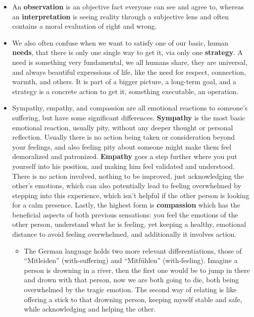 \begin{itemize}
\begin{itemize}
    \end{itemize}
    \item An \textbf{observation} is an objective fact everyone can see and agree to, whereas an \textbf{interpretation} is seeing reality through a subjective lens and often contains a moral evaluation of right and wrong.
    \item We also often confuse when we want to satisfy one of our basic, human \textbf{needs}, that there is only one single way to get it, via only one \textbf{strategy}.
    A need is something very fundamental, we all humans share, they are universal, and always beautiful expressions of life, like the need for respect, connection, warmth, and others.
    It is part of a bigger picture, a long-term goal, and a strategy is a concrete action to get it, something executable, an operation.
    \item Sympathy, empathy, and compassion are all emotional reactions to someone's suffering, but have some significant differences.
    \textbf{Sympathy} is the most basic emotional reaction, usually pity, without any deeper thought or personal reflection.
    Usually there is no action being taken or consideration beyond your feelings, and also feeling pity about someone might make them feel demoralized and patronized.
    \textbf{Empathy} goes a step further where you put yourself into his position, and making him feel validated and understood.
    There is no action involved, nothing to be improved, just acknowledging the other's emotions, which can also potentially lead to feeling overwhelmed by stepping into this experience, which isn't helpful if the other person is looking for a calm presence.
    Lastly, the highest form is \textbf{compassion} which has the beneficial aspects of both previous sensations: you feel the emotions of the other person, understand what he is feeling, yet keeping a healthy, emotional distance to avoid feeling overwhelmed, and additionally it involves action.
    \begin{itemize}
        \item The German language holds two more relevant differentiations, those of ``Mitleiden'' (with-suffering) and ``Mitfühlen'' (with-feeling).
        Imagine a person is drowning in a river, then the first one would be to jump in there and drown with that person, now we are both going to die, both being overwhelmed by the tragic emotion.
        The second way of relating is like offering a stick to that drowning person, keeping myself stable and safe, while acknowledging and helping the other.
    \end{itemize}
\end{itemize}


